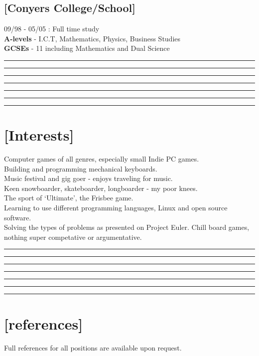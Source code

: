 \documentclass[a4paper]{res}
\newcommand{\setrule}[1]{\rule{#1}{1mm}}
\newcommand{\fibrule}[2]{ \hspace{#1}  \setrule{#2} \setrule{21mm} \setrule{13mm} \setrule{8mm} \setrule{5mm} \setrule{3mm} \setrule{2mm}  \vspace{-.52in} }
\begin{document}
\begin{resume}
\vspace{-.22in}

\subsection{[Conyers College/School]} 09/98 - 05/05 : Full time study\\
{\bf A-levels} - I.C.T, Mathematics, Physics, Business Studies \\
{\bf GCSEs} - 11 including  Mathematics and Dual Science 

\fibrule{0.9in}{3.0in}
\section{[Interests]} 

Computer games of all genres, especially small Indie PC games.\\
Building and programming mechanical keyboards.\\
Music festival and gig goer - enjoys traveling for music. \\
Keen snowboarder, skateboarder, longboarder - my poor knees. \\
The sport of `Ultimate', the Frisbee game. \\
Learning to use different programming languages, Linux and open source software.\\
Solving the types of problems as presented on Project Euler.
Chill board games, nothing super competative or argumentative.

\fibrule{1.075in}{2.825in}
\section{[references]} 

Full references for all positions are available upon request.


\end{resume}
\end{document}
